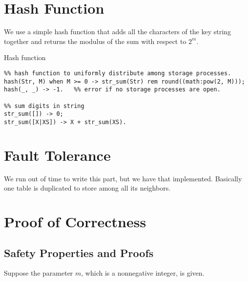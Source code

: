 \documentclass[11pt]{article}
\begin{document}
\section{Hash Function}
We use a simple hash function that adds all the characters of the key string together and returns the modulus of the sum with respect to $2^m.$

\begin{algorithm}[H]
  \caption{Hash function}\label{hash}
  \begin{lstlisting}
%% hash function to uniformly distribute among storage processes.
hash(Str, M) when M >= 0 -> str_sum(Str) rem round((math:pow(2, M)));
hash(_, _) -> -1.   %% error if no storage processes are open.
      
%% sum digits in string
str_sum([]) -> 0;
str_sum([X|XS]) -> X + str_sum(XS).
  \end{lstlisting}
\end{algorithm}

\section{Fault Tolerance}
We run out of time to write this part, but we have that implemented. Basically one table is duplicated to store among all its neighbors.
\section{Proof of Correctness}


\subsection{Safety Properties and Proofs}
Suppose the parameter $m$, which is a nonnegative integer, is given.
\end{document}
